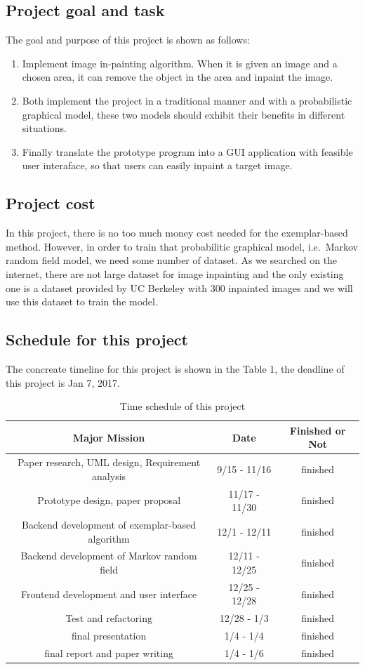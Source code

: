 \subsection{Project goal and task}
The goal and purpose of this project is shown as follows:
\begin{enumerate}
	\item Implement image in-painting algorithm. 
        When it is given an image and a chosen area, 
        it can remove the object in the area and inpaint the image.
    \item Both implement the project in a traditional manner and
        with a probabilistic graphical model, these two models should
        exhibit their benefits in different situations.
    \item Finally translate the prototype program into a GUI application
        with feasible user interaface, so that users can easily inpaint
        a target image.
\end{enumerate}
\subsection{Project cost}
In this project, there is no too much money cost needed for the 
exemplar-based method. However, in order to train that probabilitic
graphical model, i.e.\ Markov random field model, we need some number
of dataset. As we searched on the internet, there are not large dataset
for image inpainting and the only existing one is a dataset provided by
UC Berkeley with 300 inpainted images and we will use this dataset to
train the model.
\subsection{Schedule for this project}
The concreate timeline for this project is shown in the Table 1,
the deadline of this project is Jan 7, 2017.
\begin{table}
\hspace{-1cm}
\begin{tabular}{|c|c|c|}
\hline
Major Mission & Date & Finished or Not \\
\hline
Paper research, UML design, Requirement analysis
& 9/15 - 11/16& finished \\
\hline
Prototype design, paper proposal & 11/17 - 11/30 & finished \\
\hline
Backend development of exemplar-based algorithm & 12/1 - 12/11 & finished\\
\hline
Backend development of Markov random field & 12/11 - 12/25 & finished\\
\hline
Frontend development and user interface & 12/25 - 12/28 & finished\\
\hline
Test and refactoring & 12/28 - 1/3 &finished\\
\hline 
    final presentation & 1/4 - 1/4 & finished \\ \hline
    final report and paper writing & 1/4 - 1/6 & finished \\ \hline
\end{tabular}
\caption{Time schedule of this project}
\end{table}
